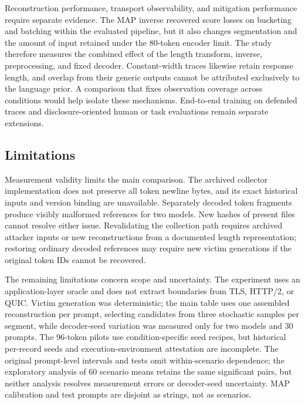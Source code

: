 \documentclass[electronics,article,submit,pdftex,moreauthors]{Definitions/mdpi}
\begin{document}
Reconstruction performance, transport observability, and mitigation performance require separate evidence. The MAP inverse recovered score losses on bucketing and batching within the evaluated pipeline, but it also changes segmentation and the amount of input retained under the 80-token encoder limit. The study therefore measures the combined effect of the length transform, inverse, preprocessing, and fixed decoder. Constant-width traces likewise retain response length, and overlap from their generic outputs cannot be attributed exclusively to the language prior. A comparison that fixes observation coverage across conditions would help isolate these mechanisms. End-to-end training on defended traces and disclosure-oriented human or task evaluations remain separate extensions.

\subsection{Limitations}
Measurement validity limits the main comparison. The archived collector implementation does not preserve all token newline bytes, and its exact historical inputs and version binding are unavailable. Separately decoded token fragments produce visibly malformed references for two models. New hashes of present files cannot resolve either issue. Revalidating the collection path requires archived attacker inputs or new reconstructions from a documented length representation; restoring ordinary decoded references may require new victim generations if the original token IDs cannot be recovered.

The remaining limitations concern scope and uncertainty. The experiment uses an application-layer oracle and does not extract boundaries from TLS, HTTP/2, or QUIC. Victim generation was deterministic; the main table uses one assembled reconstruction per prompt, selecting candidates from three stochastic samples per segment, while decoder-seed variation was measured only for two models and 30 prompts. The 96-token pilots use condition-specific seed recipes, but historical per-record seeds and execution-environment attestation are incomplete. The original prompt-level intervals and tests omit within-scenario dependence; the exploratory analysis of 60 scenario means retains the same significant pairs, but neither analysis resolves measurement errors or decoder-seed uncertainty. MAP calibration and test prompts are disjoint as strings, not as scenarios.
\end{document}
